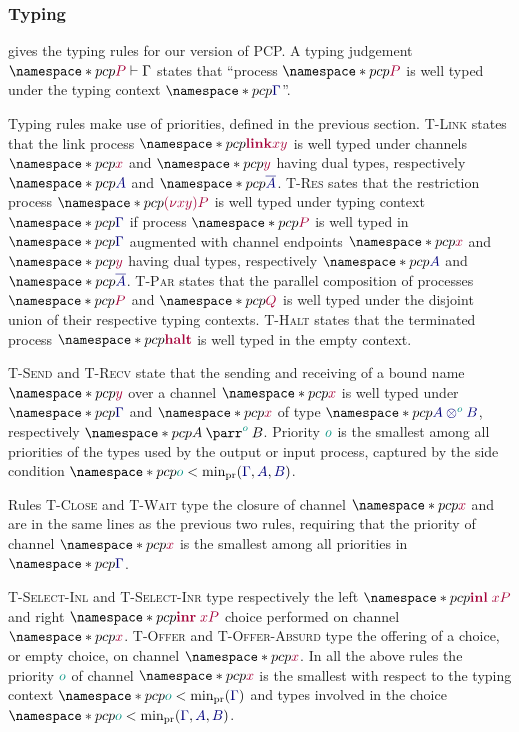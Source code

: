 \documentclass[main.tex]{subfiles}
\begin{document}


\subsubsection*{Typing}
 gives the typing rules for our version of PCP. A typing judgement $\pcp{\seq{P}{\Gamma}}$ states that ``process $\pcp{\tm{P}}$ is well typed under the typing context $\pcp{\ty{\Gamma}}$''.

Typing rules make use of priorities, defined in the previous section. \textsc{T-Link} states that the link process $\pcp{\tm{\link{x}{y}}}$ is well typed under channels $\pcp{\tm{x}}$ and $\pcp{\tm{y}}$ having dual types, respectively $\pcp{\ty{A}}$ and $\pcp{\ty{\co{A}}}$. \textsc{T-Res} sates that the restriction process $\pcp{\tm{\res{x}{y}{P}}}$ is well typed under typing context $\pcp{\ty{\Gamma}}$ if process $\pcp{\tm{P}}$ is well typed in $\pcp{\ty{\Gamma}}$ augmented with channel endpoints $\pcp{\tm{x}}$ and $\pcp{\tm{y}}$ having dual types, respectively $\pcp{\ty{A}}$ and $\pcp{\ty{\co{A}}}$. \textsc{T-Par} states that the parallel composition of processes $\pcp{\tm{P}}$ and $\pcp{\tm{Q}}$ is well typed under the disjoint union of their respective typing contexts. \textsc{T-Halt} states that the terminated process $\pcp{\tm{\halt}}$ is well typed in the empty context.

\textsc{T-Send} and \textsc{T-Recv} state that the sending and receiving of a bound name $\pcp{\tm{y}}$ over a channel $\pcp{\tm{x}}$ is well typed under $\pcp{\ty{\Gamma}}$ and $\pcp{\tm{x}}$ of type $\pcp{\ty{\tytens[\cs{o}]{A}{B}}}$, respectively $\pcp{\typarr[\cs{o}]{A}{B}}$. Priority $\cs{o}$ is the smallest among all priorities of the types used by the output or input process, captured by the side condition $\pcp{\cs{o}<\minpr(\ty{\Gamma},\ty{A},\ty{B})}$.

Rules \textsc{T-Close} and \textsc{T-Wait} type the closure of channel $\pcp{\tm{x}}$ and are in the same lines as the previous two rules, requiring that the priority of channel $\pcp{\tm{x}}$ is the smallest among all priorities in $\pcp{\ty{\Gamma}}$.

\textsc{T-Select-Inl} and \textsc{T-Select-Inr} type respectively the left $\pcp{\tm{\inl{x}{P}}}$ and right $\pcp{\tm{\inr{x}{P}}}$ choice performed on channel $\pcp{\tm{x}}$. \textsc{T-Offer} and \textsc{T-Offer-Absurd} type the offering of a choice, or empty choice, on channel $\pcp{\tm{x}}$. In all the above rules the priority $\cs{o}$ of channel $\pcp{\tm{x}}$ is the smallest with respect to the typing context $\pcp{\cs{o}<\minpr(\ty{\Gamma})}$ and types involved in the choice $\pcp{\cs{o}<\minpr(\ty{\Gamma},\ty{A},\ty{B})}$.
\end{document}
